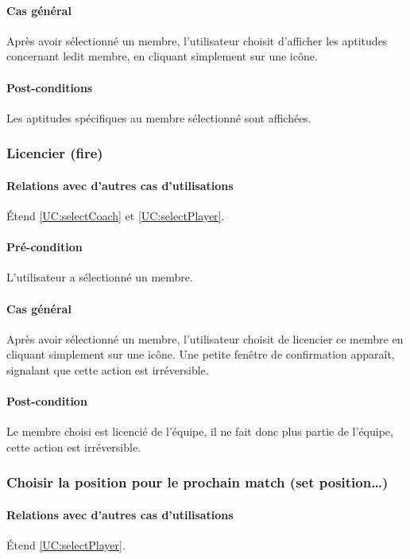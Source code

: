 \paragraph{Cas général}
Après avoir sélectionné un membre, l'utilisateur choisit d'afficher les aptitudes concernant ledit membre, en cliquant simplement sur une icône.
\paragraph{Post-conditions}
\begin{list}{}{\leftmargin=1.5em}
\item{Les aptitudes spécifiques au membre sélectionné sont affichées.}
\end{list} 

\subsubsection{Licencier (fire)}
\label{UC:fire}
\paragraph{Relations avec d'autres cas d'utilisations}
Étend \ref{UC:selectCoach} et \ref{UC:selectPlayer}.
\paragraph{Pré-condition}
L'utilisateur a sélectionné un membre.
\paragraph{Cas général}
Après avoir sélectionné un membre, l'utilisateur choisit de licencier ce membre en cliquant simplement sur une icône. Une petite fenêtre de confirmation apparaît, signalant que cette action est irréversible. 
\paragraph{Post-condition}
Le membre choisi est licencié de l'équipe, il ne fait donc plus partie de l'équipe, cette action est irréversible.

\subsubsection{Choisir la position pour le prochain match (set position…)}
\label{UC:choosePosition}
\paragraph{Relations avec d'autres cas d'utilisations}
Étend \ref{UC:selectPlayer}.
